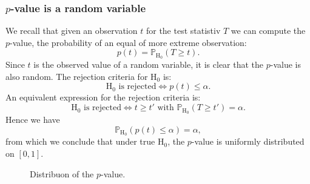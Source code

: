 \subsubsection{$p$-value is a random variable}

We recall that given an observation $t$ for the test statistiv $T$ we can compute the $p$-value, the probability of an equal of more extreme observation:
$$
    p(t) = \mathbb{P}_{\mathrm{H}_0} (T \geq t).
$$
Since $t$ is the observed value of a random variable, it is clear that the $p$-value is also random. The rejection criteria for $\mathrm{H}_0$ is: 
$$
    \mathrm{H}_0 \textrm{ is rejected} \Leftrightarrow p(t) \leq \alpha.
$$
An equivalent expression for the rejection criteria is:
$$
\mathrm{H}_0 \textrm{ is rejected} \Leftrightarrow t \geq t' \textrm{ with } \mathbb{P}_{\mathrm{H}_0} (T \geq t') = \alpha.    
$$
Hence we have
$$
    \mathbb{P}_{\mathrm{H}_0} (p(t) \leq \alpha) = \alpha,
$$
from which we conclude that under true $\mathrm{H}_0$, the $p$-value is uniformly distributed on $[0,1]$.

\begin{figure}[H]\centering
    \caption{Distribuon of the $p$-value.}
\end{figure}

